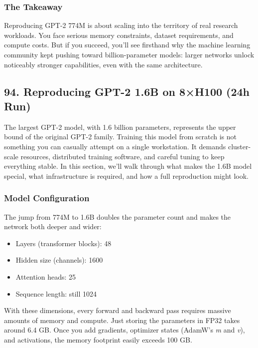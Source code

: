 \documentclass[
  letterpaper,
  DIV=11,
  numbers=noendperiod]{scrreprt}
\providecommand{\tightlist}{%
  \setlength{\itemsep}{0pt}\setlength{\parskip}{0pt}}
\begin{document}
\subsubsection{The Takeaway}\label{the-takeaway-82}

Reproducing GPT-2 774M is about scaling into the territory of real
research workloads. You face serious memory constraints, dataset
requirements, and compute costs. But if you succeed, you'll see
firsthand why the machine learning community kept pushing toward
billion-parameter models: larger networks unlock noticeably stronger
capabilities, even with the same architecture.

\subsection{94. Reproducing GPT-2 1.6B on 8×H100 (24h
Run)}\label{reproducing-gpt-2-1.6b-on-8h100-24h-run}

The largest GPT-2 model, with 1.6 billion parameters, represents the
upper bound of the original GPT-2 family. Training this model from
scratch is not something you can casually attempt on a single
workstation. It demands cluster-scale resources, distributed training
software, and careful tuning to keep everything stable. In this section,
we'll walk through what makes the 1.6B model special, what
infrastructure is required, and how a full reproduction might look.

\subsubsection{Model Configuration}\label{model-configuration-2}

The jump from 774M to 1.6B doubles the parameter count and makes the
network both deeper and wider:

\begin{itemize}
\tightlist
\item
  Layers (transformer blocks): 48
\item
  Hidden size (channels): 1600
\item
  Attention heads: 25
\item
  Sequence length: still 1024
\end{itemize}

With these dimensions, every forward and backward pass requires massive
amounts of memory and compute. Just storing the parameters in FP32 takes
around 6.4 GB. Once you add gradients, optimizer states (AdamW's
\emph{m} and \emph{v}), and activations, the memory footprint easily
exceeds 100 GB.
\end{document}
